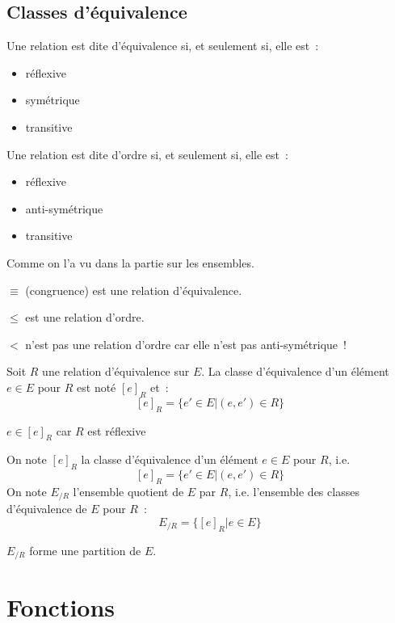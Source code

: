\documentclass[a4paper, titlepage]{article}
\begin{document}
    \subsection{Classes d'équivalence}
    \begin{defn}
        Une relation est dite d'équivalence si, et seulement si, elle est~:
        \begin{itemize}
            \item réflexive
            \item symétrique
            \item transitive
        \end{itemize}

        Une relation est dite d'ordre si, et seulement si, elle est~:
        \begin{itemize}
            \item réflexive
            \item anti-symétrique
            \item transitive
        \end{itemize}
        Comme on l'a vu dans la partie sur les ensembles.
    \end{defn}
    \begin{exemple}
        $\equiv$ (congruence) est une relation d'équivalence.

        $\leqslant$ est une relation d'ordre.

        $<$ n'est pas une relation d'ordre car elle n'est pas anti-symétrique~!
    \end{exemple}
    \begin{defn}
        Soit $R$ une relation d'équivalence sur $E$.
        La classe d'équivalence d'un élément $e\in E$ pour $R$ est noté $[e]_R$ et~:
        $$ [e]_R = \{e'\in E|(e,e')\in R\} $$
    \end{defn}
    $e\in[e]_R$ car $R$ est réflexive
    \begin{defn}
        On note $[e]_R$ la classe d'équivalence d'un élément $e\in E$ pour $R$, i.e.
        $$ [e]_R = \{e'\in E|(e,e')\in R\} $$
        On note $E_{/R}$  l'ensemble quotient de $E$ par $R$, i.e. l'ensemble des classes d'équivalence de $E$ pour $R$~:
        $$ E_{/R} = \{[e]_R|e\in E\} $$
    \end{defn}
    \begin{props}
        $E_{/R}$ forme une partition de $E$.
    \end{props}
    \section{Fonctions}
\end{document}
